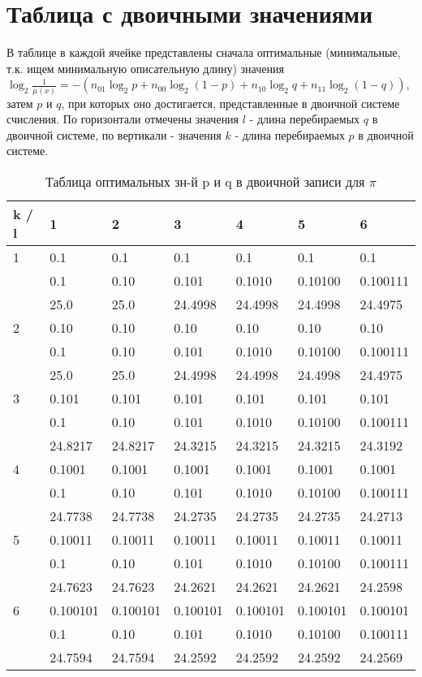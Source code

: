 \documentclass[12pt]{article}
\begin{document}
	
	\section*{Таблица с двоичными значениями}
	В таблице в каждой ячейке представлены сначала оптимальные (минимальные, т.к. ищем минимальную описательную длину) значения $\log_2{\frac{1}{\mu(x)}}=-(n_{01}\log_2{p}+n_{00}\log_2{(1-p)}+n_{10}\log_2{q}+n_{11}\log_2{(1-q)})$, затем $p$ и $q$, при которых оно достигается, представленные в двоичной системе счисления. По горизонтали отмечены значения $l$ - длина перебираемых $q$  в двоичной системе, по вертикали - значения $k$ - длина перебираемых $p$  в двоичной системе.
	
	\begin{table}[h]
		\caption{Таблица оптимальных зн-й p и q в двоичной записи для $\pi$}
		\label{sometable}
		\begin{center}
			\begin{tabular}{|l|l|l|l|l|l|l|}
				\hline
				k / l &1 & 2 & 3 & 4 & 5 & 6\\
				\hline
				1 & 0.1& 0.1& 0.1& 0.1& 0.1& 0.1\\
				& 0.1& 0.10& 0.101& 0.1010& 0.10100& 0.100111\\
				& 25.0& 25.0& 24.4998& 24.4998& 24.4998& 24.4975\\
				\hline
				2 & 0.10& 0.10& 0.10& 0.10& 0.10& 0.10\\
				& 0.1& 0.10& 0.101& 0.1010& 0.10100& 0.100111\\
				& 25.0& 25.0& 24.4998& 24.4998& 24.4998& 24.4975\\
				\hline
				3 & 0.101& 0.101& 0.101& 0.101& 0.101& 0.101\\
				& 0.1& 0.10& 0.101& 0.1010& 0.10100& 0.100111\\
				& 24.8217& 24.8217& 24.3215& 24.3215& 24.3215& 24.3192\\
				\hline
				4 & 0.1001& 0.1001& 0.1001& 0.1001& 0.1001& 0.1001\\
				& 0.1& 0.10& 0.101& 0.1010& 0.10100& 0.100111\\
				& 24.7738& 24.7738& 24.2735& 24.2735& 24.2735& 24.2713\\
				\hline
				5 & 0.10011& 0.10011& 0.10011& 0.10011& 0.10011& 0.10011\\
				& 0.1& 0.10& 0.101& 0.1010& 0.10100& 0.100111\\
				& 24.7623& 24.7623& 24.2621& 24.2621& 24.2621& 24.2598\\
				\hline
				6 & 0.100101& 0.100101& 0.100101& 0.100101& 0.100101& 0.100101\\
				& 0.1& 0.10& 0.101& 0.1010& 0.10100& 0.100111\\
				& 24.7594& 24.7594& 24.2592& 24.2592& 24.2592& 24.2569\\
				\hline
			\end{tabular}
		\end{center}
	\end{table}
	
\end{document}
